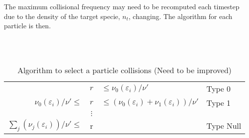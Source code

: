     The maximum collisional frequency may need to be recomputed each timestep due
    to the density of the target specie,  \(n_t\), changing. The algorithm for
    each particle is then.
    \\ \\
    \begin{table}
        \begin{algorithmic}
                \\
                    \begin{tabular}{r c l l}
                        & \(r\) &\(\leq \nu_0(\varepsilon_i)/\nu' \qquad\)
                        & Type 0
                        \\
                        \(\nu_0(\varepsilon_i)/\nu' \leq\) & \(r\) & \( \leq (\nu_0(\varepsilon_i) + \nu_1(\varepsilon_i))/\nu'\)
                        & Type 1
                        \\
                        & \(\vdots\) &
                        \\
                        \(\sum_j(\nu_j(\varepsilon_i))/\nu' \leq\) & r & & Type Null
                    \end{tabular}
                \EndIf
            \EndFor
        \end{algorithmic}
        \caption{Algorithm to select a particle collisions (Need to be improved)}
    \end{table}
